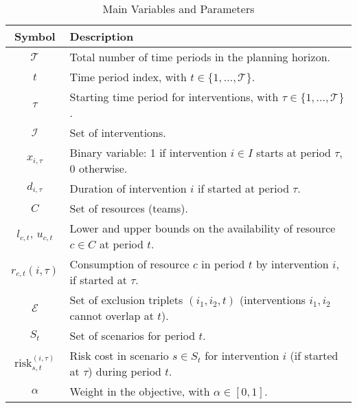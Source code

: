 \begin{table}[!ht]
  \centering
  \begin{tabular}{|c|p{13cm}|}
    \hline
    \textbf{Symbol} & \textbf{Description} \\ \hline
    $\mathcal{T}$ & Total number of time periods in the planning horizon. \\ \hline
    $t$ & Time period index, with $t \in \{1,\ldots,\mathcal{T}\}$. \\ \hline
    $\tau$ & Starting time period for interventions, with $\tau \in \{1,\ldots,\mathcal{T}\}$. \\ \hline
    $\mathcal{I}$ & Set of interventions. \\ \hline
    $x_{i,\tau}$ & Binary variable: 1 if intervention $i\in I$ starts at period $\tau$, 0 otherwise. \\ \hline
    $d_{i,\tau}$ & Duration of intervention $i$ if started at period $\tau$. \\ \hline
    $C$ & Set of resources (teams). \\ \hline
    $l_{c,t},\, u_{c,t}$ & Lower and upper bounds on the availability of resource $c\in C$ at period $t$. \\ \hline
    $r_{c,t}(i,\tau)$ & Consumption of resource $c$ in period $t$ by intervention $i$, if started at $\tau$. \\ \hline
    $\mathcal{E}$ & Set of exclusion triplets $(i_1,i_2,t)$ (interventions $i_1,i_2$ cannot overlap at $t$). \\ \hline
    $S_t$ & Set of scenarios for period $t$. \\ \hline
    $\mathrm{risk}_{s,t}^{(i,\tau)}$ & Risk cost in scenario $s\in S_t$ for intervention $i$ (if started at $\tau$) during period $t$. \\ \hline
    $\alpha$ & Weight in the objective, with $\alpha\in[0,1]$. \\ \hline
  \end{tabular}
  \caption{Main Variables and Parameters}
  \label{tab:variables}
\end{table}

\vspace{1em}


